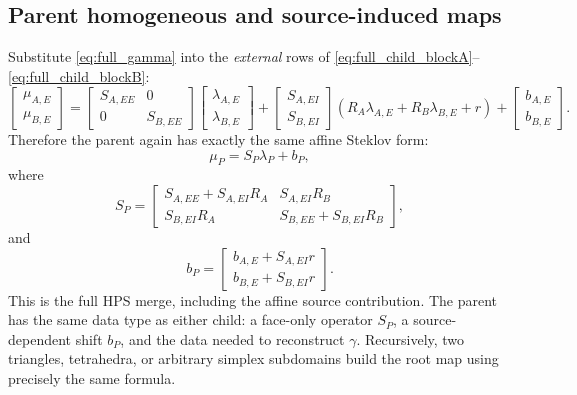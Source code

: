\documentclass[11pt]{article}
\begin{document}
\subsection{Parent homogeneous and source-induced maps}
Substitute \eqref{eq:full_gamma} into the \emph{external} rows of
\eqref{eq:full_child_blockA}--\eqref{eq:full_child_blockB}:
\begin{equation}\label{eq:full_parent_flux_compact}
 \begin{bmatrix}\mu_{A,E}\\\mu_{B,E}\end{bmatrix}
 =\begin{bmatrix}S_{A,EE}&0\\0&S_{B,EE}\end{bmatrix}
 \begin{bmatrix}\lambda_{A,E}\\\lambda_{B,E}\end{bmatrix}
 +\begin{bmatrix}S_{A,EI}\\S_{B,EI}\end{bmatrix}
 (R_A\lambda_{A,E}+R_B\lambda_{B,E}+r)
 +\begin{bmatrix}b_{A,E}\\b_{B,E}\end{bmatrix}.
\end{equation}
Therefore the parent again has exactly the same affine Steklov form:
\begin{equation}\label{eq:full_parent_Sb}
 \boxed{\mu_P=S_P\lambda_P+b_P,}
\end{equation}
where
\begin{equation}\label{eq:full_parent_S_block}
 \boxed{\displaystyle
 S_P=\begin{bmatrix}
 S_{A,EE}+S_{A,EI}R_A&S_{A,EI}R_B\\
 S_{B,EI}R_A&S_{B,EE}+S_{B,EI}R_B
 \end{bmatrix},}
\end{equation}
and
\begin{equation}\label{eq:full_parent_b_block}
 \boxed{\displaystyle
 b_P=\begin{bmatrix}
 b_{A,E}+S_{A,EI}r\\
 b_{B,E}+S_{B,EI}r
 \end{bmatrix}.}
\end{equation}
This is the full HPS merge, including the affine source contribution.
The parent has the same data type as either child: a face-only
operator $S_P$, a source-dependent shift $b_P$, and the data needed
to reconstruct $\gamma$.  Recursively, two triangles, tetrahedra, or
arbitrary simplex subdomains build the root map using precisely the
same formula.
\end{document}
